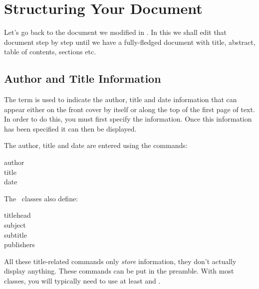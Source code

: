 \chapter{Structuring Your Document}
\label{ch:sections}

Let's go back to the document we modified in .
In this  we shall edit that document
step by step until we have a fully-fledged document with title,
abstract, table of contents, sections etc.


\section{Author and Title Information}
\label{sec:title}

The term  is used to indicate the author, title and
date information that can appear either on the front cover by itself
or along the top of the first page of text.  In order to do this, you
must first specify the information.  Once this information has been
specified it can then be displayed.

The author, title and date are entered using the 
\glspl{command}:
\begin{definition}
\gls{author}
\\%
\gls{title}
\\%
\gls{date}
\end{definition}%
The \koma\ classes also define:
\begin{definition}
\gls{titlehead}\\
\gls{subject}\\
\gls{subtitle}\\
\gls{publishers}
\end{definition}

All these title-related
commands only \emph{store} information, they don't actually display
anything. These commands can be put in the \gls{preamble}. With most
classes, you will typically need to use at least  and
.

